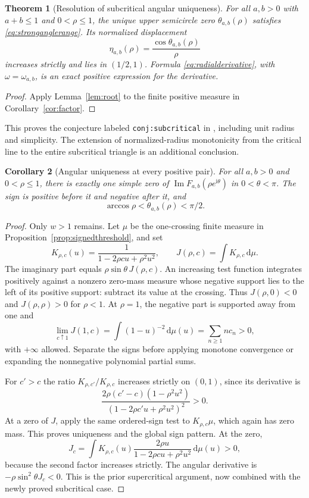 \documentclass[11pt]{article}
\numberwithin{equation}{section}
\newtheorem{theorem}{Theorem}[section]
\newtheorem{corollary}[theorem]{Corollary}
\theoremstyle{definition}
\theoremstyle{remark}
\DeclareMathOperator{\Impart}{Im}
\newcommand{\dd}{\,\mathrm d}
\newcommand{\ii}{\mathrm i}
\begin{document}
\begin{theorem}[Resolution of subcritical angular uniqueness]
\label{thm:subcriticalangular}
For all $a,b>0$ with $a+b\le1$ and $0<\rho\le1$, the unique upper
semicircle zero $\theta_{a,b}(\rho)$ satisfies
\eqref{eq:stronganglerange}. Its normalized displacement
\[
 \eta_{a,b}(\rho)=\frac{\cos\theta_{a,b}(\rho)}\rho
\]
increases strictly and lies in $(1/2,1)$. Formula
\eqref{eq:radialderivative}, with $\omega=\omega_{a,b}$, is an exact
positive expression for the derivative.
\end{theorem}
\begin{proof}
Apply Lemma~\ref{lem:root} to the finite positive measure in
Corollary~\ref{cor:factor}.
\end{proof}

This proves the conjecture labeled \texttt{conj:subcritical} in
\cite{threshold}, including unit radius and simplicity. The extension
of normalized-radius monotonicity from the critical line to the entire
subcritical triangle is an additional conclusion.

\begin{corollary}[Angular uniqueness at every positive pair]
\label{cor:allangular}
For all $a,b>0$ and $0<\rho\le1$, there is exactly one simple zero of
$\Impart F_{a,b}(\rho e^{\ii\theta})$ in $0<\theta<\pi$. The sign
is positive before it and negative after it, and
\[
 \arccos\rho<\theta_{a,b}(\rho)<\pi/2.
\]
\end{corollary}
\begin{proof}
Only $w>1$ remains. Let $\mu$ be the one-crossing finite measure in
Proposition~\ref{prop:signedthreshold}, and set
\[
 K_{\rho,c}(u)=\frac1{1-2\rho cu+\rho^2u^2},\qquad
 J(\rho,c)=\int K_{\rho,c}\dd\mu.
\]
The imaginary part equals $\rho\sin\theta\,J(\rho,c)$.
An increasing test function integrates positively against a nonzero
zero-mass measure whose negative support lies to the left of its
positive support: subtract its value at the crossing. Thus
$J(\rho,0)<0$ and $J(\rho,\rho)>0$ for $\rho<1$.
At $\rho=1$, the negative part is supported away from one and
\[
 \lim_{c\uparrow1}J(1,c)
 =\int(1-u)^{-2}\dd\mu(u)=\sum_{n\ge1}n c_n>0,
\]
with $+\infty$ allowed. Separate the signs before applying monotone
convergence or expanding the nonnegative polynomial partial sums.

For $c'>c$ the ratio $K_{\rho,c'}/K_{\rho,c}$ increases strictly on
$(0,1)$, since its derivative is
\[
 \frac{2\rho(c'-c)(1-\rho^2u^2)}
 {(1-2\rho c'u+\rho^2u^2)^2}>0.
\]
At a zero of $J$, apply the same ordered-sign test to
$K_{\rho,c}\mu$, which again has zero mass. This proves uniqueness
and the global sign pattern. At the zero,
\[
 J_c=\int K_{\rho,c}(u)
          \frac{2\rho u}{1-2\rho cu+\rho^2u^2}\dd\mu(u)>0,
\]
because the second factor increases strictly. The angular derivative
is $-\rho\sin^2\theta J_c<0$. This is the prior supercritical argument,
now combined with the newly proved subcritical case.
\end{proof}
\end{document}
